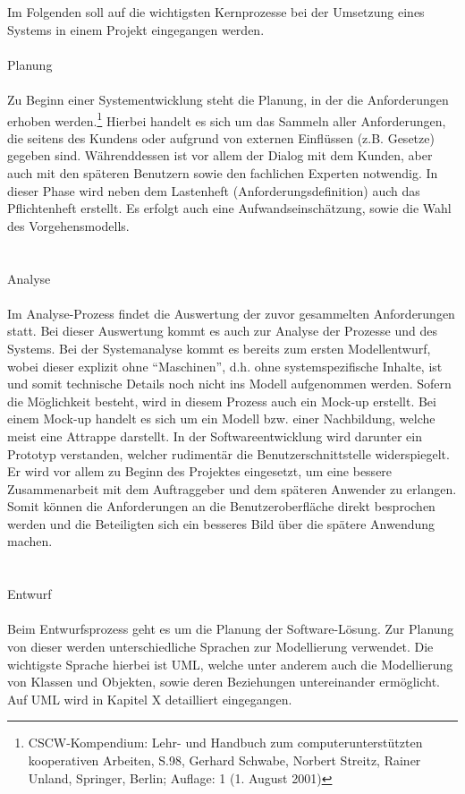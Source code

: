 Im Folgenden soll auf die wichtigsten Kernprozesse bei der Umsetzung eines Systems in einem Projekt eingegangen werden.\\
\\
Planung\\
\\
Zu Beginn einer Systementwicklung steht die Planung, in der die Anforderungen erhoben werden.\footnote{CSCW-Kompendium: Lehr- und Handbuch zum computerunterstützten kooperativen Arbeiten, S.98,  Gerhard Schwabe, Norbert Streitz, Rainer Unland, Springer, Berlin; Auflage: 1 (1. August 2001)}
Hierbei handelt es sich um das Sammeln aller Anforderungen, die seitens des Kundens oder aufgrund von externen Einflüssen (z.B. Gesetze) gegeben sind.
Währenddessen ist vor allem der Dialog mit dem Kunden, aber auch mit den späteren Benutzern sowie den fachlichen Experten notwendig.
In dieser Phase wird neben dem Lastenheft (Anforderungsdefinition) auch das Pflichtenheft erstellt. Es erfolgt auch eine Aufwandseinschätzung, sowie die Wahl des Vorgehensmodells.\\
\\
\\
Analyse\\
\\
Im Analyse-Prozess findet die Auswertung der zuvor gesammelten Anforderungen statt.
Bei dieser Auswertung kommt es auch zur Analyse der Prozesse und des Systems.
Bei der Systemanalyse kommt es bereits zum ersten Modellentwurf, wobei dieser explizit ohne “Maschinen”, d.h. ohne systemspezifische Inhalte, ist und somit technische Details noch nicht ins Modell aufgenommen werden.
Sofern die Möglichkeit besteht, wird in diesem Prozess auch ein Mock-up erstellt.
Bei einem Mock-up handelt es sich um ein Modell bzw. einer Nachbildung, welche meist eine Attrappe darstellt.
In der Softwareentwicklung wird darunter ein Prototyp verstanden, welcher rudimentär die Benutzerschnittstelle widerspiegelt.
Er wird vor allem zu Beginn des Projektes eingesetzt, um eine bessere Zusammenarbeit mit dem Auftraggeber und dem späteren Anwender zu erlangen.
Somit können die Anforderungen an die Benutzeroberfläche direkt besprochen werden und die Beteiligten sich ein besseres Bild über die spätere Anwendung machen.\\
\\
\\
Entwurf\\
\\
Beim Entwurfsprozess geht es um die Planung der Software-Lösung. Zur Planung von dieser werden unterschiedliche Sprachen zur Modellierung verwendet. Die wichtigste Sprache hierbei ist UML, welche unter anderem auch die Modellierung von Klassen und Objekten, sowie deren Beziehungen untereinander ermöglicht. Auf UML wird in Kapitel X detailliert eingegangen.
